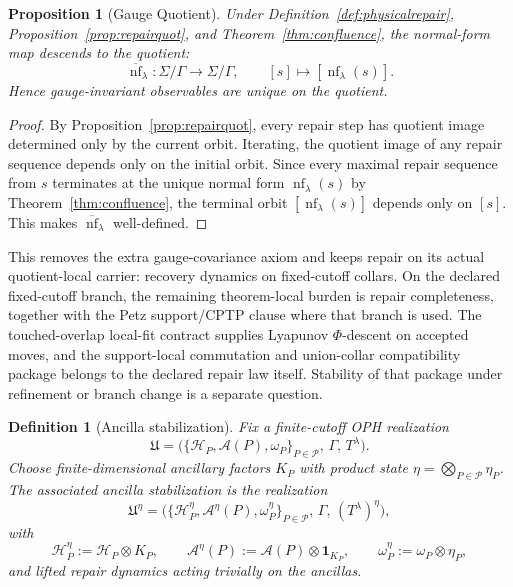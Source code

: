 \documentclass[11pt]{article}
\newtheorem{proposition}[theorem]{Proposition}
\newtheorem{definition}[theorem]{Definition}
\newcommand{\nf}{\operatorname{nf}}
\begin{document}
\begin{proposition}[Gauge Quotient]\label{prop:gauge}
Under Definition~\ref{def:physicalrepair}, Proposition~\ref{prop:repairquot}, and
Theorem~\ref{thm:confluence}, the normal-form map descends to the quotient:
\[
\overline{\nf}_\lambda:\Sigma/\Gamma\to\Sigma/\Gamma,
\qquad
[s]\mapsto [\nf_\lambda(s)].
\]
Hence gauge-invariant observables are unique on the quotient.
\end{proposition}

\begin{proof}
By Proposition~\ref{prop:repairquot}, every repair step has quotient image determined only by the
current orbit. Iterating, the quotient image of any repair sequence depends only on the initial
orbit. Since every maximal repair sequence from \(s\) terminates at the unique normal form
\(\nf_\lambda(s)\) by Theorem~\ref{thm:confluence}, the terminal orbit \([\nf_\lambda(s)]\)
depends only on \([s]\). This makes \(\overline{\nf}_\lambda\) well-defined.
\end{proof}

This removes the extra gauge-covariance axiom and keeps repair on its actual quotient-local
carrier: recovery dynamics on fixed-cutoff collars. On the declared fixed-cutoff branch, the
remaining theorem-local burden is repair completeness, together with the Petz support/CPTP clause
where that branch is used. The touched-overlap local-fit contract supplies Lyapunov
\(\Phi\)-descent on accepted moves, and the support-local commutation and union-collar
compatibility package belongs to the declared repair law itself. Stability of that package under
refinement or branch change is a separate question.

\begin{definition}[Ancilla stabilization]\label{def:ancillastab}
Fix a finite-cutoff OPH realization
\[
\mathfrak U=
\bigl(\{\mathcal H_P,\mathcal A(P),\omega_P\}_{P\in\mathcal P},\,\Gamma,\,T^\lambda\bigr).
\]
Choose finite-dimensional ancillary factors \(K_P\) with product state \(\eta=\bigotimes_{P\in\mathcal P}\eta_P\). The associated ancilla stabilization is the realization
\[
\mathfrak U^\eta=
\bigl(\{\mathcal H_P^\eta,\mathcal A^\eta(P),\omega_P^\eta\}_{P\in\mathcal P},\,\Gamma,\,(T^\lambda)^\eta\bigr),
\]
with
\[
\mathcal H_P^\eta:=\mathcal H_P\otimes K_P,\qquad
\mathcal A^\eta(P):=\mathcal A(P)\otimes \mathbf 1_{K_P},\qquad
\omega_P^\eta:=\omega_P\otimes \eta_P,
\]
and lifted repair dynamics acting trivially on the ancillas.
\end{definition}
\end{document}

